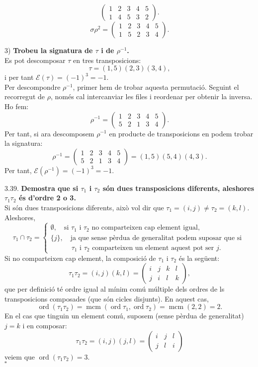 \documentclass[11pt]{article}
\DeclareMathOperator{\ord}{ord}
\DeclareMathOperator{\mcm}{mcm}
\begin{document}
\begin{legal}
\begin{legal}
$$\begin{pmatrix}
		1 & 2 & 3 & 4 & 5\\
		1 & 4 & 5 & 3 & 2
		\end{pmatrix}.
		$$
		$$
		\sigma\rho^2=\begin{pmatrix}
		1 & 2 & 3 & 4 & 5\\
		1 & 5 & 2 & 3 & 4
		\end{pmatrix}.
		$$
		\item[3) ]\textbf{Trobeu la signatura de $\tau$ i de $\rho^{-1}$.}\\
		Es pot descomposar $\tau$ en tres transposicions:
		$$\tau=(1,5)(2,3)(3,4),$$
		i per tant $\mathcal{E}(\tau)=(-1)^3=-1.$\\
		Per descompondre $\rho^{-1}$, primer hem de trobar aquesta permutació. Seguint el recorregut de $\rho$, només cal intercanviar les files i reordenar per obtenir la inversa. Ho fem:
		$$\rho^{-1}=\begin{pmatrix}
		1 & 2 & 3 & 4 & 5\\
		5 & 2 & 1 & 3 & 4
		\end{pmatrix}.
		$$
		Per tant, si ara descomposem $\rho^{-1}$ en producte de transposicions en podem trobar la signatura:
		$$
		\rho^{-1}=\begin{pmatrix}
		1 & 2 & 3 & 4 & 5\\
		5 & 2 & 1 & 3 & 4
		\end{pmatrix}
		=(1,5)(5,4)(4,3).
		$$
		Per tant, $\mathcal{E}(\rho^{-1})=(-1)^3=-1$.
	\end{legal}\newpage
	\item[3.39.] \textbf{Demostra que si $\tau_1$ i $\tau_2$ són dues transposicions diferents, aleshores $\tau_1\tau_2$ és d'ordre 2 o 3.}\\
	Si són dues transposicions diferents, això vol dir que $\tau_1=(i,j)\neq\tau_2=(k,l)$. Aleshores,
	$$
	\tau_1\cap\tau_2=\begin{cases}
	\emptyset,\quad\textrm{si }\tau_1\textrm{ i }\tau_2\textrm{ no comparteixen cap element igual,}\\
	\{j\},\quad\textrm{ja que sense pèrdua de generalitat podem suposar que si }\\
	\qquad\quad\tau_1\textrm{ i }\tau_2\textrm{ comparteixen un element aquest pot ser }j.
	\end{cases}
	$$
	Si no comparteixen cap element, la composició de $\tau_1$ i $\tau_2$ és la següent:
	$$
	\tau_1\tau_2=(i,j)(k,l)=\begin{pmatrix}
	i & j & k & l\\
	j & i & l & k
	\end{pmatrix},
	$$
	que per definició té ordre igual al mínim comú múltiple dels ordres de ls transposicions composades (que són cicles disjunts). En aquest cas,
	$$
	\ord(\tau_1\tau_2)=\mcm(\ord{\tau_1},\ord{\tau_2})=\mcm(2,2)=2.
	$$
	En el cas que tinguin un element comú, suposem (sense pèrdua de generalitat) $j=k$ i en composar:
	$$
	\tau_1\tau_2=(i,j)(j,l)=\begin{pmatrix}
	i & j & l\\
	j & l & i
	\end{pmatrix}
	$$
	veiem que $\ord(\tau_1\tau_2)=3$.\\
	$\square$
\end{legal}
\end{document}
